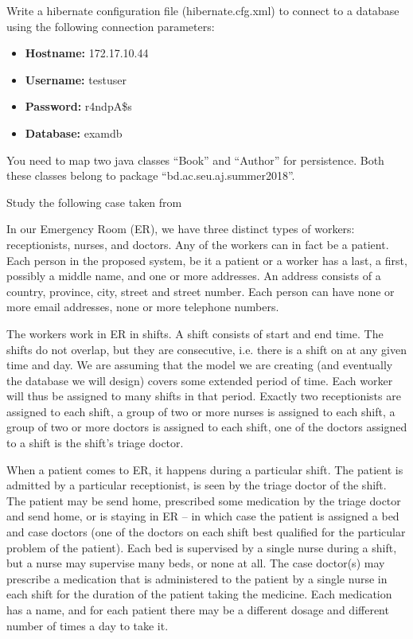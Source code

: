\documentclass[addpoints,12pt]{exam}
\begin{document}
\begin{questions}
\question[10]
Write a hibernate configuration file (hibernate.cfg.xml) to connect to a database using the following connection parameters:
\begin{itemize}
\item \textbf{Hostname:} 172.17.10.44
\item \textbf{Username:} testuser
\item \textbf{Password:} r4ndpA\$s
\item \textbf{Database:} examdb
\end{itemize}
You need to map two java classes ``Book'' and ``Author'' for persistence. Both these classes belong to package ``bd.ac.seu.aj.summer2018''.

\question[10]
Study the following case taken from \cite[Chapter 8]{CZ}
\begin{mdframed}
In our Emergency Room (ER), we have three distinct types of workers: receptionists, nurses, and doctors. Any of the workers can in fact be a patient. Each person in the proposed system, be it a patient or a worker has a last, a first, possibly a middle name, and one or more addresses. An address consists of a country, province, city, street and street number. Each person can have none or more email addresses, none or more telephone numbers.

The workers work in ER in shifts. A shift consists of start and end time. The shifts do not overlap, but they are consecutive, i.e. there is a shift on at any given time and day. We are assuming that the model we are creating (and eventually the database we will design) covers some extended period of time. Each worker will thus be assigned to many shifts in that period. Exactly two receptionists are assigned to each shift, a group of two or more nurses is assigned to each shift, a group of two or more doctors is assigned to each shift, one of the doctors assigned to a shift is the shift's triage doctor.

When a patient comes to ER, it happens during a particular shift. The patient is admitted by a particular receptionist, is seen by the triage doctor of the shift. The patient may be send home, prescribed some medication by the triage doctor and send home, or is staying in ER – in which case the patient is assigned a bed and case doctors (one of the doctors on each shift best qualified for the particular problem of the patient). Each bed is supervised by a single nurse during a shift, but a nurse may supervise many beds, or none at all. The case doctor(s) may prescribe a medication that is administered to the patient by a single nurse in each shift for the duration of the patient taking the medicine. Each medication has a name, and for each patient there may be a different dosage and different number of times a day to take it.
\end{mdframed}


\end{questions}
\end{document}
